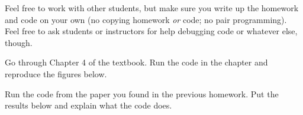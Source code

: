 \documentclass[12pt,letterpaper]{pset}
\begin{document}
Feel free to work with other students, but make sure you write up the homework
and code on your own (no copying homework \textit{or} code; no pair programming).
Feel free to ask students or instructors for help debugging code or whatever else,
though.\\

\begin{problem}[1]
  Go through Chapter 4 of the textbook. Run the code in the chapter and
  reproduce the figures below.
\end{problem}

\begin{solution}
    \vfill
\end{solution}

\newpage

\begin{problem}[2]
  Run the code from the paper you found in the previous homework. Put the
  results below and explain what the code does.
\end{problem}

\begin{solution}
    \vfill
\end{solution}

\newpage
\end{document}

